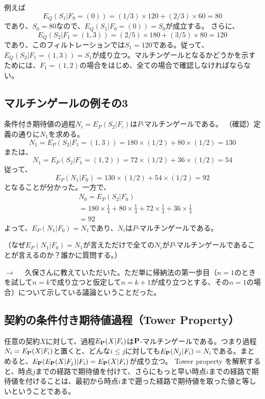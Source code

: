 \documentclass[uplatex,a4j,12pt,dvipdfmx]{jsarticle}
\begin{document}
例えば\[E_Q( S_1 | F_0 = (0) ) = (1/3) \times 120 + (2/3) \times 60 = 80\]であり、$S_{0}=80$なので、$E_Q( S_1 | F_0 = (0) ) = S_0$が成立する。
さらに、\[E_Q( S_2 | F_1 = (1,3) ) = (2/5) \times 180 + (3/5) \times 80 = 120\]であり、このフィルトレーションでは$S_1 =120$である。従って、$E_Q( S_2 | F_1 = (1,3) ) = S_1$が成り立つ。マルチンゲールとなるかどうかを示すためには、$F_1 = (1,2)$の場合をはじめ、全ての場合で確認しなければならない。

\subsection{マルチンゲールの例その3}
条件付き期待値の過程$N_i = E_P ( S_2 | F_i )$は$P$-マルチンゲールである。
（確認）定義の通りに$N_1$を求める。
\[N_1 = E_P ( S_2 | F_1 = (1,3) ) = 180 \times (1/2) + 80 \times (1/2) = 130\]
または、
\[N_1 = E_P ( S_2 | F_1 = (1,2) ) = 72 \times (1/2) + 36 \times (1/2) = 54\]
従って、
\[E_P( N_1 | F_0 ) = 130 \times (1/2) + 54 \times (1/2) = 92\]
となることが分かった。一方で、
\begin{align*}
	 & N_0 = E_P ( S_2 | F_0)                                                                           \\
	 & = 180 \times \frac{1}{4} + 80 \times \frac{1}{4} + 72 \times \frac{1}{4} + 36 \times \frac{1}{4} \\
	 & = 92
\end{align*}
よって、$E_P( N_1 | F_0 ) = N_1$であり、$N_i$は$P$-マルチンゲールである。

（なぜ$E_P( N_1 | F_0 ) = N_1$が言えただけで全ての$N_i$が$P$-マルチンゲールであることが言えるのか？誰かに質問する。）

$\longrightarrow$ 　久保さんに教えていただいた。ただ単に帰納法の第一歩目（$n=1$のときを試して$n=k$で成り立つと仮定して$n=k+1$が成り立つとする、その$n=1$の場合）について示している議論ということだった。

\subsection{契約の条件付き期待値過程（Tower Property）}
任意の契約$X$に対して、過程$E_{\bf P}(X|F_i)$は${\bf P}$-マルチンゲールである。つまり過程$N_i = E_{\bf P} (X|F_i)$と置くと、どんな$i \le j$に対しても$E_{\bf P}( N_j | F_i ) = N_i$である。まとめると、$E_{\bf P}( E_{\bf P}( X | F_j ) | F_i ) = E_{\bf P}( X | F_i )$が成り立つ。
Tower property を解釈すると、時点$j$までの経路で期待値を付けて、さらにもっと早い時点$i$までの経路で期待値を付けることは、最初から時点$i$まで遡った経路で期待値を取った値と等しいということである。
\end{document}

